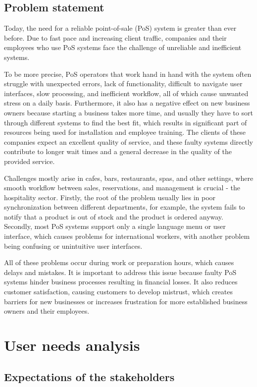 \documentclass{article}
\begin{document}
\subsection{Problem statement}  Today, the need for a reliable point-of-sale (PoS) system is greater than ever before. Due to fast pace and increasing client traffic, companies and their employees who use PoS systems face the challenge of unreliable and inefficient systems.
\par To be more precise, PoS operators that work hand in hand with the system often struggle with unexpected errors, lack of functionality, difficult to navigate user interfaces, slow processing, and inefficient workflow, all of which cause unwanted stress on a daily basis. Furthermore, it also has a negative effect on new business owners because starting a business takes more time, and usually they have to sort through different systems to find the best fit, which results in significant part of resources being used for installation and employee training. The clients of these companies expect an excellent quality of service, and these faulty systems directly contribute to longer wait times and a general decrease in the quality of the provided service.
\par Challenges mostly arise in cafes, bars, restaurants, spas, and other settings, where smooth workflow between sales, reservations, and management is crucial - the hospitality sector. Firstly, the root of the problem usually lies in poor synchronization between different departments, for example, the system fails to notify that a product is out of stock and the product is ordered anyway. Secondly, most PoS systems support only a single language menu or user interface, which causes problems for international workers, with another problem being confusing or unintuitive user interfaces.
\par All of these problems occur during work or preparation hours, which causes delays and mistakes. It is important to address this issue because faulty PoS systems hinder business processes resulting in financial losses. It also reduces customer satisfaction, causing customers to develop mistrust, which creates barriers for new businesses or increases frustration for more established business owners and their employees.
\newpage

\section{User needs analysis}
\subsection{Expectations of the stakeholders}
\end{document}
